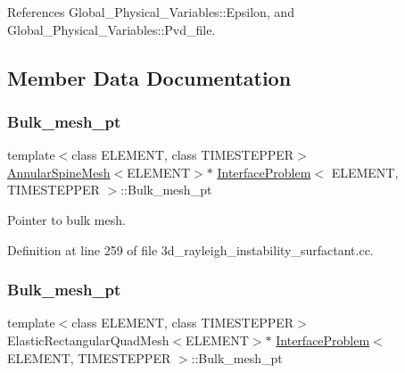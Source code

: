 References Global\+\_\+\+Physical\+\_\+\+Variables\+::\+Epsilon, and Global\+\_\+\+Physical\+\_\+\+Variables\+::\+Pvd\+\_\+file.



\subsection{Member Data Documentation}
\mbox{\label{classInterfaceProblem_a444b33e2ccb3eacdc619abda73575a50}} 
\subsubsection{\texorpdfstring{Bulk\+\_\+mesh\+\_\+pt}{Bulk\_mesh\_pt}\hspace{0.1cm}{\footnotesize\ttfamily [1/3]}}
{\footnotesize\ttfamily template$<$class E\+L\+E\+M\+E\+NT, class T\+I\+M\+E\+S\+T\+E\+P\+P\+ER$>$ \\
\hyperlink{classoomph_1_1AnnularSpineMesh}{Annular\+Spine\+Mesh}$<$E\+L\+E\+M\+E\+NT$>$$\ast$ \hyperlink{classInterfaceProblem}{Interface\+Problem}$<$ E\+L\+E\+M\+E\+NT, T\+I\+M\+E\+S\+T\+E\+P\+P\+ER $>$\+::Bulk\+\_\+mesh\+\_\+pt\hspace{0.3cm}{\ttfamily [private]}}



Pointer to bulk mesh. 



Definition at line 259 of file 3d\+\_\+rayleigh\+\_\+instability\+\_\+surfactant.\+cc.

\mbox{\label{classInterfaceProblem_af580057bd9cc1d05a67401c9e5e178c2}} 
\subsubsection{\texorpdfstring{Bulk\+\_\+mesh\+\_\+pt}{Bulk\_mesh\_pt}\hspace{0.1cm}{\footnotesize\ttfamily [2/3]}}
{\footnotesize\ttfamily template$<$class E\+L\+E\+M\+E\+NT, class T\+I\+M\+E\+S\+T\+E\+P\+P\+ER$>$ \\
Elastic\+Rectangular\+Quad\+Mesh$<$E\+L\+E\+M\+E\+NT$>$$\ast$ \hyperlink{classInterfaceProblem}{Interface\+Problem}$<$ E\+L\+E\+M\+E\+NT, T\+I\+M\+E\+S\+T\+E\+P\+P\+ER $>$\+::Bulk\+\_\+mesh\+\_\+pt}



